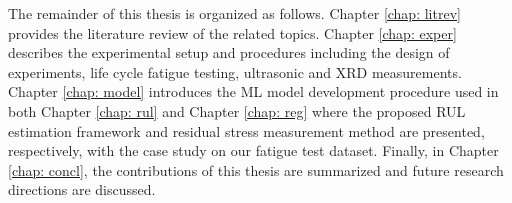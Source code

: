 
The remainder of this thesis is organized as follows. Chapter \ref{chap: litrev} provides the literature review of the related topics. Chapter \ref{chap: exper} describes the experimental setup and procedures including the design of experiments, life cycle fatigue testing, ultrasonic and XRD measurements. Chapter \ref{chap: model} introduces the ML model development procedure used in both Chapter \ref{chap: rul} and Chapter \ref{chap: reg} where the proposed RUL estimation framework and residual stress measurement method are presented, respectively, with the case study on our fatigue test dataset. Finally, in Chapter \ref{chap: concl}, the contributions of this thesis are summarized and future research directions are discussed.

